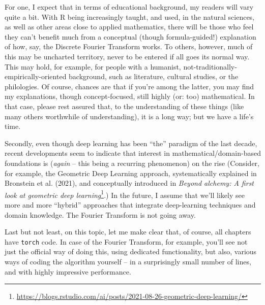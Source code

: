 \documentclass[
  letterpaper,
]{krantz}
\DeclareRobustCommand{\href}[2]{#2\footnote{\url{#1}}}
\begin{document}
For one, I expect that in terms of educational background, my readers
will vary quite a bit. With R being increasingly taught, and used, in
the natural sciences, as well as other areas close to applied
mathematics, there will be those who feel they can't benefit much from a
conceptual (though formula-guided!) explanation of how, say, the
Discrete Fourier Transform works. To others, however, much of this may
be uncharted territory, never to be entered if all goes its normal way.
This may hold, for example, for people with a humanist,
not-traditionally-empirically-oriented background, such as literature,
cultural studies, or the philologies. Of course, chances are that if
you're among the latter, you may find my explanations, though
concept-focused, still highly (or: too) mathematical. In that case,
please rest assured that, to the understanding of these things (like
many others worthwhile of understanding), it is a long way; but we have
a life's time.

Secondly, even though deep learning has been ``the'' paradigm of the
last decade, recent developments seem to indicate that interest in
mathematical/domain-based foundations is (\emph{again} -- this being a
recurring phenomenon) on the rise (Consider, for example, the Geometric
Deep Learning approach, systematically explained in Bronstein et al.
(2021), and conceptually introduced in
\href{https://blogs.rstudio.com/ai/posts/2021-08-26-geometric-deep-learning/}{\emph{Beyond
alchemy: A first look at geometric deep learning}}.) In the future, I
assume that we'll likely see more and more ``hybrid'' approaches that
integrate deep-learning techniques and domain knowledge. The Fourier
Transform is not going away.

Last but not least, on this topic, let me make clear that, of course,
all chapters have \texttt{torch} code. In case of the Fourier Transform,
for example, you'll see not just the official way of doing this, using
dedicated functionality, but also, various ways of coding the algorithm
yourself -- in a surprisingly small number of lines, and with highly
impressive performance.
\end{document}
